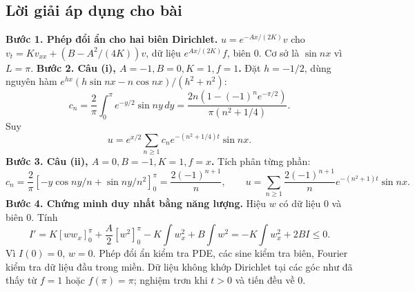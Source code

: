 \documentclass[10pt,a4paper]{article}
\begin{document}
\subsection*{Lời giải áp dụng cho bài}
\textbf{Bước 1. Phép đổi ẩn cho hai biên Dirichlet.}
$u=e^{-Ax/(2K)}v$ cho $v_t=Kv_{xx}+(B-A^2/(4K))v$, dữ liệu $e^{Ax/(2K)}f$, biên $0$. Cơ sở là $\sin nx$ vì $L=\pi$.
\textbf{Bước 2. Câu (i), $A=-1,B=0,K=1,f=1$.}
Đặt $h=-1/2$, dùng nguyên hàm $e^{hx}(h\sin nx-n\cos nx)/(h^2+n^2)$:
\[c_n=\frac2\pi\int_0^\pi e^{-y/2}\sin ny\,dy
=\frac{2n(1-(-1)^ne^{-\pi/2})}{\pi(n^2+1/4)}.\]
Suy
\[u=e^{x/2}\sum_{n\ge1}c_ne^{-(n^2+1/4)t}\sin nx.\]
\textbf{Bước 3. Câu (ii), $A=0,B=-1,K=1,f=x$.}
Tích phân từng phần:
\[c_n=\frac2\pi[-y\cos ny/n+\sin ny/n^2]_0^\pi
=\frac{2(-1)^{n+1}}n,\qquad
u=\sum_{n\ge1}\frac{2(-1)^{n+1}}n e^{-(n^2+1)t}\sin nx.\]
\textbf{Bước 4. Chứng minh duy nhất bằng năng lượng.}
Hiệu $w$ có dữ liệu $0$ và biên $0$. Tính
\[I'=K[ww_x]_0^\pi+\frac A2[w^2]_0^\pi-K\int w_x^2+B\int w^2
=-K\int w_x^2+2BI\le0.\]
Vì $I(0)=0$, $w=0$. Phép đổi ẩn kiểm tra PDE, các sine kiểm tra biên, Fourier kiểm tra dữ liệu đầu trong miền. Dữ liệu không khớp Dirichlet tại các góc như đã thấy từ $f=1$ hoặc $f(\pi)=\pi$; nghiệm trơn khi $t>0$ và tiến đều về $0$.
\end{document}
